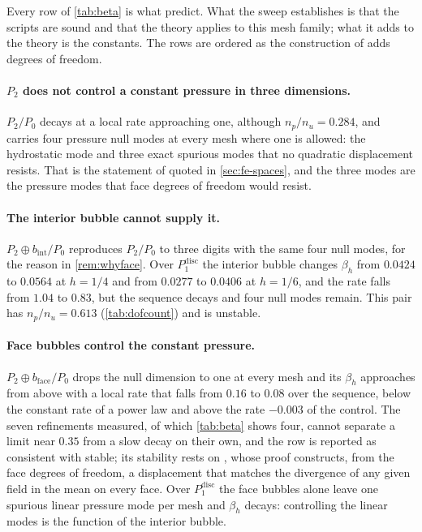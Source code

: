 \documentclass{article}
\theoremstyle{definition}
\theoremstyle{plain}
\begin{document}
Every row of \cref{tab:beta} is what \textcite{BoffiBrezziFortin:2013}
predict. What the sweep establishes is that the scripts are sound and that the theory
applies to this mesh family; what it adds to the theory is the constants. The
rows are ordered as the construction of
\textcite[Example~8.7.2]{BoffiBrezziFortin:2013} adds degrees of freedom.

\paragraph{$P_2$ does not control a constant pressure in three dimensions.}
$P_2/P_0$ decays at a local rate approaching one, although $n_p/n_u = 0.284$,
and carries four pressure null modes
at every mesh where one is allowed: the hydrostatic mode and three exact
spurious modes that no quadratic displacement resists. That is the statement
of \textcite[\S8.7]{BoffiBrezziFortin:2013} quoted in \cref{sec:fe-spaces}, and
the three modes are the pressure modes that face degrees of freedom would
resist.

\paragraph{The interior bubble cannot supply it.} $P_2 \oplus
b_{\mathrm{int}}/P_0$ reproduces $P_2/P_0$ to three digits with the same four
null modes, for the reason in \cref{rem:whyface}. Over
$P_1^{\mathrm{disc}}$ the interior bubble changes $\beta_h$ from $0.0424$ to
$0.0564$ at $h = 1/4$ and from $0.0277$ to $0.0406$ at $h = 1/6$, and the
rate falls from $1.04$ to $0.83$, but the sequence decays and four null modes
remain. This pair has $n_p/n_u = 0.613$ (\cref{tab:dofcount}) and is
unstable.

\paragraph{Face bubbles control the constant pressure.} $P_2 \oplus
b_{\mathrm{face}}/P_0$ drops the null dimension to one at every mesh and its
$\beta_h$ approaches from above with a local rate that falls from $0.16$ to
$0.08$ over the sequence, below the constant rate of a power law and above the
rate $-0.003$ of the control.
The seven refinements measured, of which \cref{tab:beta} shows four,
cannot separate a limit near $0.35$ from a slow decay on their own, and the
row is reported as consistent with stable; its
stability rests on \textcite[Example~8.7.2]{BoffiBrezziFortin:2013}, whose proof
constructs, from the face degrees of freedom, a displacement that matches the
divergence of any given field in the mean on every face.
Over $P_1^{\mathrm{disc}}$ the face bubbles alone leave one spurious linear
pressure mode per mesh and $\beta_h$ decays: controlling the linear modes is
the function of the interior bubble.
\end{document}
